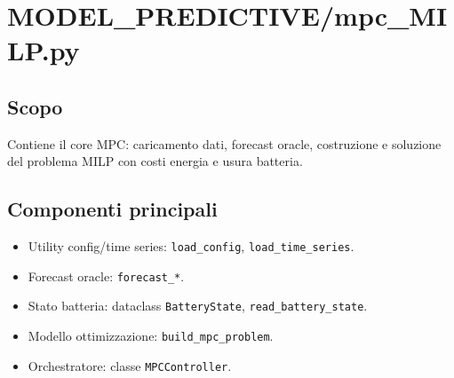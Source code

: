 \section{MODEL\_PREDICTIVE/mpc\_MILP.py}

\subsection*{Scopo}
Contiene il core MPC: caricamento dati, forecast oracle, costruzione e soluzione del problema MILP con costi energia e usura batteria.

\subsection*{Componenti principali}
\begin{itemize}[leftmargin=1.2cm]
\item Utility config/time series: \texttt{load\_config}, \texttt{load\_time\_series}.
\item Forecast oracle: \texttt{forecast\_*}.
\item Stato batteria: dataclass \texttt{BatteryState}, \texttt{read\_battery\_state}.
\item Modello ottimizzazione: \texttt{build\_mpc\_problem}.
\item Orchestratore: classe \texttt{MPCController}.
\end{itemize}

